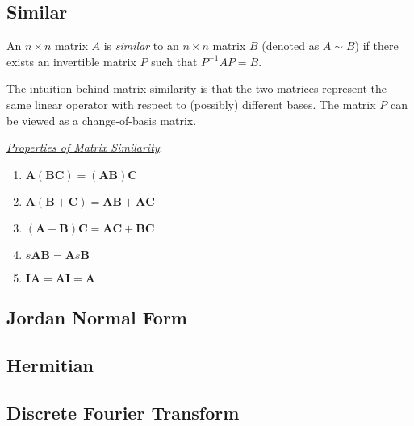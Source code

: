 \subsection{Similar}
\begin{definition}[Similar]
  An $n\times n$ matrix $A$ is \emph{similar} to an $n\times n$ matrix $B$ (denoted as $A\sim B$) if there exists an invertible matrix $P$ such that $P^{-1}AP=B$.
\end{definition}

The intuition behind matrix similarity is that the two matrices represent the same linear operator with respect to (possibly) different bases. The matrix $P$ can be viewed as a change-of-basis matrix. 

\noindent\underline{\textit{Properties of Matrix Similarity}}:
\begin{enumerate}[label=\theenumi)]
    \item $\bm{A}(\bm{BC})=(\bm{AB})\bm{C}$
    \item $\bm{A}(\bm{B}+\bm{C})=\bm{AB} + \bm{AC}$
    \item $(\bm{A+B})\bm{C}=\bm{AC} + \bm{BC}$
    \item $s\bm{AB}=\bm{A}s\bm{B}$
    \item $\bm{IA}=\bm{AI}=\bm{A}$
\end{enumerate}


\subsection{Jordan Normal Form}
\subsection{Hermitian}
\subsection{Discrete Fourier Transform}
